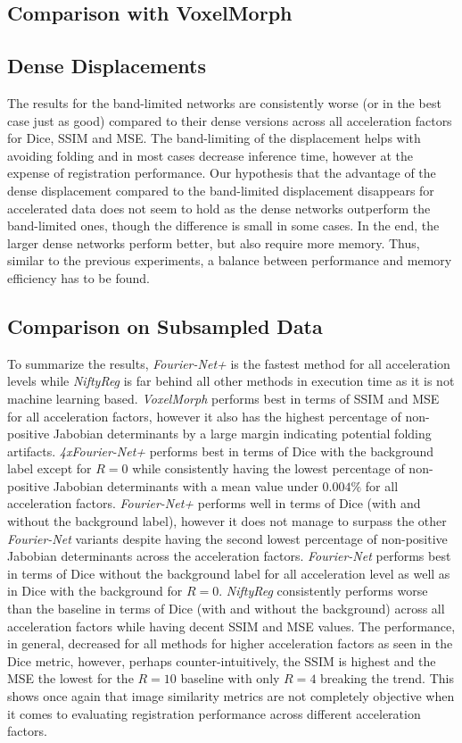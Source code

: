 \documentclass[english,version-2022-01]{uzl-thesis} %
\begin{document}
\subsection{Comparison with VoxelMorph} \label{SubSec:DiscussionComparisonVoxelMorph}


\subsection{Dense Displacements} \label{SubSec:DiscussionDenseDisplacements}
The results for the band-limited networks are consistently worse (or in the best case just as good) compared to their dense versions across all acceleration factors for Dice, SSIM and MSE. The band-limiting of the displacement helps with avoiding folding and in most cases decrease inference time, however at the expense of registration performance. Our hypothesis that the advantage of the dense displacement compared to the band-limited displacement disappears for accelerated data does not seem to hold as the dense networks outperform the band-limited ones, though the difference is small in some cases. In the end, the larger dense networks perform better, but also require more memory. Thus, similar to the previous experiments, a balance between performance and memory efficiency has to be found.

\subsection{Comparison on Subsampled Data} \label{SubSec:DiscussionComparisonSubsampling}
To summarize the results, \emph{Fourier-Net+} is the fastest method for all acceleration levels while \emph{NiftyReg} is far behind all other methods in execution time as it is not machine learning based. \emph{VoxelMorph} performs best in terms of SSIM and MSE for all acceleration factors, however it also has the highest percentage of non-positive Jabobian determinants by a large margin indicating potential folding artifacts. \emph{4xFourier-Net+} performs best in terms of Dice with the background label except for $R=0$ while consistently having the lowest percentage of non-positive Jabobian determinants with a mean value under $0.004\%$ for all acceleration factors. \emph{Fourier-Net+} performs well in terms of Dice (with and without the background label), however it does not manage to surpass the other \emph{Fourier-Net} variants despite having the second lowest percentage of non-positive Jabobian determinants across the acceleration factors. \emph{Fourier-Net} performs best in terms of Dice without the background label for all acceleration level as well as in Dice with the background for $R=0$. \emph{NiftyReg} consistently performs worse than the baseline in terms of Dice (with and without the background) across all acceleration factors while having decent SSIM and MSE values. The performance, in general, decreased for all methods for higher acceleration factors as seen in the Dice metric, however, perhaps counter-intuitively, the SSIM is highest and the MSE the lowest for the $R=10$ baseline with only $R=4$ breaking the trend. This shows once again that image similarity metrics are not completely objective when it comes to evaluating registration performance across different acceleration factors.
\end{document}
